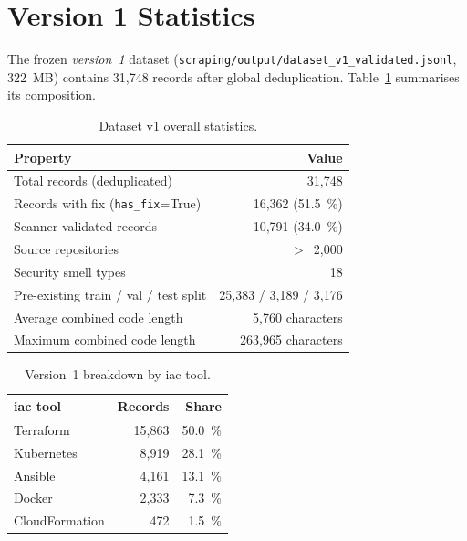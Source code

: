 \documentclass[12pt, a4paper]{report}
\begin{document}
\section{Version 1 Statistics}

The frozen \emph{version~1} dataset
(\texttt{scraping/output/dataset\_v1\_validated.jsonl}, 322~MB) contains
31{,}748 records after global deduplication. Table~\ref{tab:v1-stats}
summarises its composition.

\begin{table}[H]
  \centering
  \caption{Dataset v1 overall statistics.}
  \label{tab:v1-stats}
  \small
  \begin{tabular}{lr}
    \toprule
    \textbf{Property} & \textbf{Value} \\
    \midrule
    Total records (deduplicated) & 31{,}748 \\
    Records with fix (\texttt{has\_fix}=True) & 16{,}362 (51.5~\%) \\
    Scanner-validated records & 10{,}791 (34.0~\%) \\
    Source repositories & $>$~2{,}000 \\
    Security smell types & 18 \\
    Pre-existing train / val / test split & 25{,}383 / 3{,}189 / 3{,}176 \\
    Average combined code length & 5{,}760 characters \\
    Maximum combined code length & 263{,}965 characters \\
    \bottomrule
  \end{tabular}
\end{table}

\begin{table}[H]
  \centering
  \caption{Version~1 breakdown by \gls{iac} tool.}
  \label{tab:v1-by-tool}
  \small
  \begin{tabular}{lrr}
    \toprule
    \textbf{\gls{iac} tool} & \textbf{Records} & \textbf{Share} \\
    \midrule
    Terraform       & 15{,}863 & 50.0~\% \\
    Kubernetes      &  8{,}919 & 28.1~\% \\
    Ansible         &  4{,}161 & 13.1~\% \\
    Docker          &  2{,}333 &  7.3~\% \\
    CloudFormation  &    472   &  1.5~\% \\
    \bottomrule
  \end{tabular}
\end{table}
\end{document}
